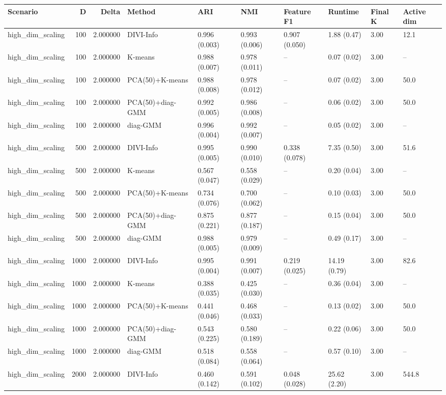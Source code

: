\begin{tabular}{lrrlllllll}
\toprule
Scenario & D & Delta & Method & ARI & NMI & Feature F1 & Runtime & Final K & Active dim \\
\midrule
high_dim_scaling & 100 & 2.000000 & DIVI-Info & 0.996 (0.003) & 0.993 (0.006) & 0.907 (0.050) & 1.88 (0.47) & 3.00 & 12.1 \\
high_dim_scaling & 100 & 2.000000 & K-means & 0.988 (0.007) & 0.978 (0.011) & -- & 0.07 (0.02) & 3.00 & -- \\
high_dim_scaling & 100 & 2.000000 & PCA(50)+K-means & 0.988 (0.008) & 0.978 (0.012) & -- & 0.07 (0.02) & 3.00 & 50.0 \\
high_dim_scaling & 100 & 2.000000 & PCA(50)+diag-GMM & 0.992 (0.005) & 0.986 (0.008) & -- & 0.06 (0.02) & 3.00 & 50.0 \\
high_dim_scaling & 100 & 2.000000 & diag-GMM & 0.996 (0.004) & 0.992 (0.007) & -- & 0.05 (0.02) & 3.00 & -- \\
high_dim_scaling & 500 & 2.000000 & DIVI-Info & 0.995 (0.005) & 0.990 (0.010) & 0.338 (0.078) & 7.35 (0.50) & 3.00 & 51.6 \\
high_dim_scaling & 500 & 2.000000 & K-means & 0.567 (0.047) & 0.558 (0.029) & -- & 0.20 (0.04) & 3.00 & -- \\
high_dim_scaling & 500 & 2.000000 & PCA(50)+K-means & 0.734 (0.076) & 0.700 (0.062) & -- & 0.10 (0.03) & 3.00 & 50.0 \\
high_dim_scaling & 500 & 2.000000 & PCA(50)+diag-GMM & 0.875 (0.221) & 0.877 (0.187) & -- & 0.15 (0.04) & 3.00 & 50.0 \\
high_dim_scaling & 500 & 2.000000 & diag-GMM & 0.988 (0.005) & 0.979 (0.009) & -- & 0.49 (0.17) & 3.00 & -- \\
high_dim_scaling & 1000 & 2.000000 & DIVI-Info & 0.995 (0.004) & 0.991 (0.007) & 0.219 (0.025) & 14.19 (0.79) & 3.00 & 82.6 \\
high_dim_scaling & 1000 & 2.000000 & K-means & 0.388 (0.035) & 0.425 (0.030) & -- & 0.36 (0.04) & 3.00 & -- \\
high_dim_scaling & 1000 & 2.000000 & PCA(50)+K-means & 0.441 (0.046) & 0.468 (0.033) & -- & 0.13 (0.02) & 3.00 & 50.0 \\
high_dim_scaling & 1000 & 2.000000 & PCA(50)+diag-GMM & 0.543 (0.225) & 0.580 (0.189) & -- & 0.22 (0.06) & 3.00 & 50.0 \\
high_dim_scaling & 1000 & 2.000000 & diag-GMM & 0.518 (0.084) & 0.558 (0.064) & -- & 0.57 (0.10) & 3.00 & -- \\
high_dim_scaling & 2000 & 2.000000 & DIVI-Info & 0.460 (0.142) & 0.591 (0.102) & 0.048 (0.028) & 25.62 (2.20) & 3.00 & 544.8 \\

\end{tabular}
